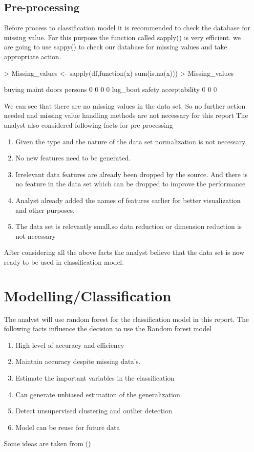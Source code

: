 \documentclass{article}
\begin{document}
\subsection{Pre-processing}
Before process to classification model it is recommended to check the database for missing value. For this purpose  the function called sapply() is very efficient. we are going to use sappy() to check our database for missing values and take appropriate action.
\break
\begin{Schunk}
\begin{Sinput}
> Missing_values <- sapply(df,function(x) sum(is.na(x)))
> Missing_values
\end{Sinput}
\begin{Soutput}
       buying         maint         doors       persons 
            0             0             0             0 
     lug_boot        safety acceptability 
            0             0             0 
\end{Soutput}
\end{Schunk}
We can see that there are no missing values in the data set. So no further action needed and missing value handling methods are not necessary for this report
\break
The analyst also considered following facts for pre-processing 
\begin{enumerate}
  \item Given the type and the nature of the data set normalization is not necessary.
  \item No new features need to be generated.
  \item Irrelevant data features are already been dropped by the source. And there is no feature in the data set which can be dropped to improve the performance
  \item Analyst already added the names of features earlier for better visualization and other purposes.
  \item The data set is relevantly small.so data reduction or dimension reduction is not necessary
\end{enumerate}
After considering all the above facts the analyst believe that the data set is now ready to be used in classification model.

\newpage
\section{Modelling/Classification}
The analyst will use random forest for the classification model in this report. The following facts influence the decision to use the Random forest model
\begin{enumerate}
  \item High level of accuracy and efficiency
  \item Maintain accuracy despite missing data's.
  \item Estimate the important variables in the classification
  \item Can generate unbiased estimation of the generalization
  \item Detect unsupervised clustering and outlier detection
  \item Model can be reuse for future data
\end{enumerate}
Some ideas are taken from (\textcite{Walker})
\end{document}
